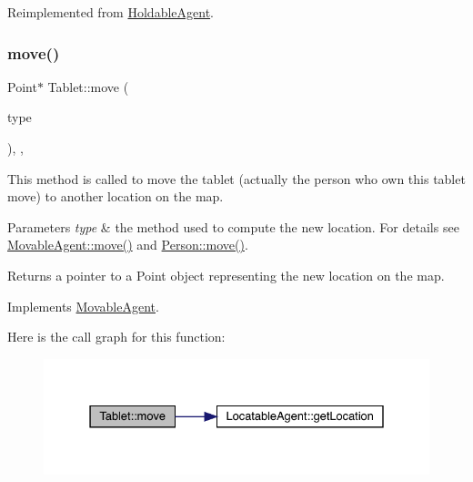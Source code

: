 Reimplemented from \mbox{\hyperlink{class_holdable_agent_ab330bb40de51a957ef8826af629f94a2}{Holdable\+Agent}}.

\mbox{\label{class_tablet_a0021a8d61f496d84540f675b1cb7d080}} 
\subsubsection{\texorpdfstring{move()}{move()}}
{\footnotesize\ttfamily Point$\ast$ Tablet\+::move (\begin{DoxyParamCaption}\item[{\mbox{\hyperlink{_movement_type_8h_a8a93b61bc797a7d1907f42796a252493}{Movement\+Type}}}]{type }\end{DoxyParamCaption})\hspace{0.3cm}{\ttfamily [inline]}, {\ttfamily [override]}, {\ttfamily [virtual]}}

This method is called to move the tablet (actually the person who own this tablet move) to another location on the map. 
\begin{DoxyParams}{Parameters}
{\em type} & the method used to compute the new location. For details see \mbox{\hyperlink{class_movable_agent_a35299e133c6787689b553d74ce5f98f0}{Movable\+Agent\+::move()}} and \mbox{\hyperlink{class_person_a89843e85f14abc08422273c20252ae23}{Person\+::move()}}. \\
\hline
\end{DoxyParams}
\begin{DoxyReturn}{Returns}
a pointer to a Point object representing the new location on the map. 
\end{DoxyReturn}


Implements \mbox{\hyperlink{class_movable_agent_a35299e133c6787689b553d74ce5f98f0}{Movable\+Agent}}.

Here is the call graph for this function\+:
\nopagebreak
\begin{figure}[H]
\begin{center}
\leavevmode
\includegraphics[width=331pt]{class_tablet_a0021a8d61f496d84540f675b1cb7d080_cgraph}
\end{center}
\end{figure}
\mbox{\label{class_tablet_a3fae01e7d526699476221c6a686a4fba}} 
